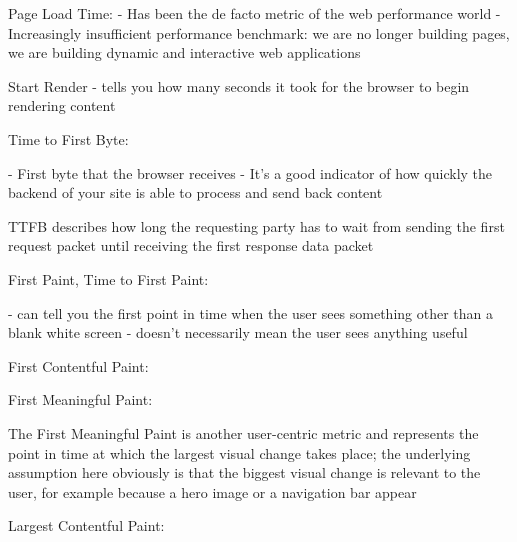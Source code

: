 Page Load Time: %
- Has been the de facto metric of the web performance world
- Increasingly insufficient performance benchmark: we are no longer building pages, we are building dynamic and interactive web applications




Start Render %
- tells you how many seconds it took for the browser to begin rendering content


Time to First Byte: %

- First byte that the browser receives
- It’s a good indicator of how quickly the backend of your site is able to process and send back content


TTFB describes how long the requesting party has to wait from sending the first request packet until receiving the first response data packet







First Paint, Time to First Paint: %


- can tell you the first point in time when the user sees something other than a blank white screen
- doesn’t necessarily mean the user sees anything useful




First Contentful Paint: %




First Meaningful Paint: %

The First Meaningful Paint is another user-centric metric and represents the point in time at which the largest visual change takes place; the underlying assumption here obviously is that the biggest visual change is relevant to the user, for example because a hero image or a navigation bar appear





Largest Contentful Paint: %

